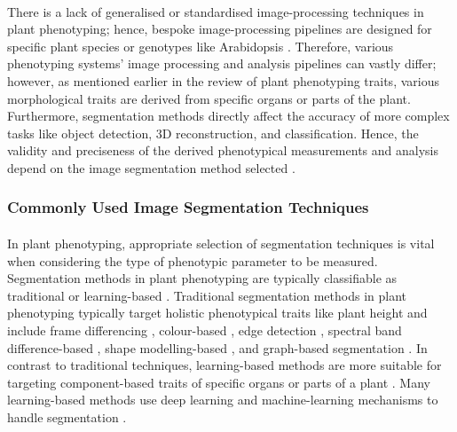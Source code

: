 \paragraph{}
There is a lack of generalised or standardised image-processing techniques in plant phenotyping; hence, bespoke image-processing pipelines are designed for specific plant species or genotypes like Arabidopsis \cite{liReviewImagingTechniques2014, arvidssonGrowthPhenotypingPipeline2011a}. Therefore, various phenotyping systems' image processing and analysis pipelines can vastly differ; however, as mentioned earlier in the review of plant phenotyping traits, various morphological traits are derived from specific organs or parts of the plant. Furthermore, segmentation methods directly affect the accuracy of more complex tasks like object detection, 3D reconstruction, and classification. Hence, the validity and preciseness of the derived phenotypical measurements and analysis depend on the image segmentation method selected \cite{choudhurySegmentationTechniquesChallenges2020, muller-linowPlantScreenMobile2019}.

\subsubsection{Commonly Used Image Segmentation Techniques}
\paragraph{}
In plant phenotyping, appropriate selection of segmentation techniques is vital when considering the type of phenotypic parameter to be measured. Segmentation methods in plant phenotyping are typically classifiable as traditional or learning-based \cite{choudhurySegmentationTechniquesChallenges2020}. Traditional segmentation methods in plant phenotyping typically target holistic phenotypical traits like plant height and include frame differencing \cite{daschoudhuryHolisticComponentPlant2018}, colour-based \cite{hamudaSurveyImageProcessing2016a}, edge detection \cite{wangImageSegmentationOverlapping2018}, spectral band difference-based \cite{gampaDatadrivenApproachDetecting2019}, shape modelling-based \cite{chenLeafSegmentationFunctional2019}, and graph-based segmentation \cite{praveenkumarImageBasedLeaf2019}. In contrast to traditional techniques, learning-based methods are more suitable for targeting component-based traits of specific organs or parts of a plant \cite{choudhurySegmentationTechniquesChallenges2020}. Many learning-based methods use deep learning and machine-learning mechanisms to handle segmentation \cite{papeUtilizingMachineLearning2015, abdallaFinetuningConvolutionalNeural2019}.